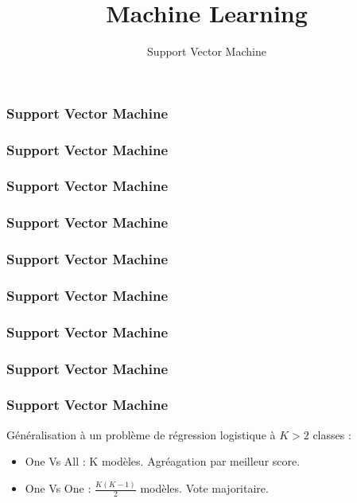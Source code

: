 \documentclass{formation}
\title{Machine Learning}
\subtitle{Support Vector Machine}
\begin{document}
\maketitle

\begin{frame}
  \frametitle{Support Vector Machine}
\end{frame}

\begin{frame}
  \frametitle{Support Vector Machine}
\end{frame}

\begin{frame}
  \frametitle{Support Vector Machine}
\end{frame}

\begin{frame}
  \frametitle{Support Vector Machine}
\end{frame}

\begin{frame}
  \frametitle{Support Vector Machine}
\end{frame}

\begin{frame}
  \frametitle{Support Vector Machine}
\end{frame}

\begin{frame}
  \frametitle{Support Vector Machine}
\end{frame}

\begin{frame}
  \frametitle{Support Vector Machine}
\end{frame}

\begin{frame}
  \frametitle{Support Vector Machine}
  Généralisation à un problème de régression logistique à $K>2$ classes :
  \begin{itemize}
  \item One Vs All : K modèles. Agréagation par meilleur score.
  \item One Vs One : $\frac{K(K-1)}{2}$ modèles. Vote majoritaire.
  \end{itemize}
\end{frame}
\end{document}
